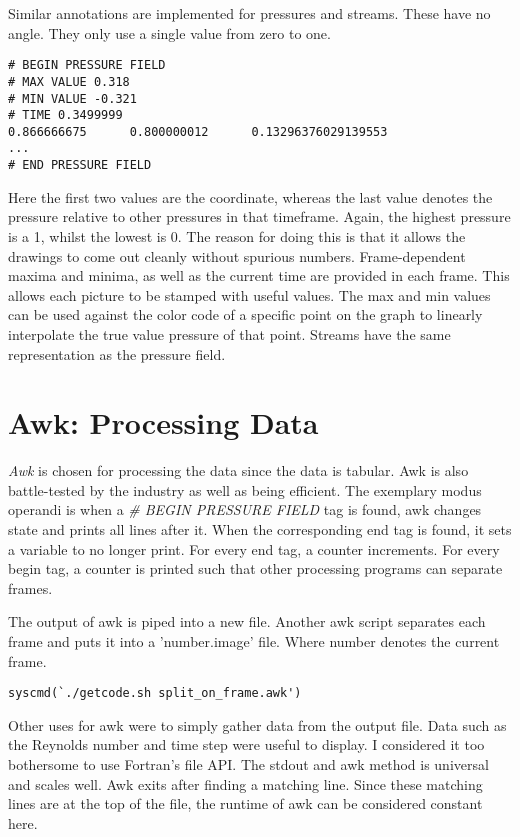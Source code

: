 \documentclass[listof=totoc]{report}
\begin{document}
Similar annotations are implemented for pressures and streams. These have no angle. They only use a single value from zero to one.

\begin{verbatim}
# BEGIN PRESSURE FIELD
# MAX VALUE 0.318
# MIN VALUE -0.321
# TIME 0.3499999
0.866666675      0.800000012      0.13296376029139553
...
# END PRESSURE FIELD
\end{verbatim}

Here the first two values are the coordinate, whereas the last value denotes the pressure relative to other pressures in that timeframe. Again, the highest pressure is a 1, whilst the lowest is 0. The reason for doing this is that it allows the drawings to come out cleanly without spurious numbers. Frame-dependent maxima and minima, as well as the current time are provided in each frame. This allows each picture to be stamped with useful values. The max and min values can be used against the color code of a specific point on the graph to linearly interpolate the true value pressure of that point. Streams have the same representation as the pressure field.

\section{Awk: Processing Data}
\emph{Awk} is chosen for processing the data since the data is tabular. Awk is also battle-tested by the industry as well as being efficient.
The exemplary modus operandi is when a \emph{\# BEGIN PRESSURE FIELD} tag is found, awk changes state and prints all lines after it. When the corresponding end tag is found, it sets a variable to no longer print. For every end tag, a counter increments. For every begin tag, a counter is printed such that other processing programs can separate frames.

The output of awk is piped into a new file. Another awk script separates each frame and puts it into a 'number.image' file. Where number denotes the current frame.

\begin{verbatim}
syscmd(`./getcode.sh split_on_frame.awk')
\end{verbatim}

Other uses for awk were to simply gather data from the output file. Data such as the Reynolds number and time step were useful to display. I considered it too bothersome to use Fortran's file API. The stdout and awk method is universal and scales well. Awk exits after finding a matching line. Since these matching lines are at the top of the file, the runtime of awk can be considered constant here.
\end{document}
